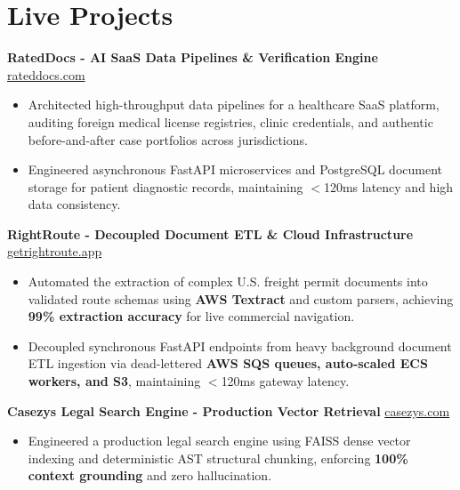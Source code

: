 \documentclass[9.5pt,a4paper]{article}
\begin{document}
\section*{Live Projects}
\noindent
\textbf{RatedDocs - AI SaaS Data Pipelines \& Verification Engine} \hfill \href{https://rateddocs.com}{rateddocs.com}
\begin{itemize}
    \item Architected high-throughput data pipelines for a healthcare SaaS platform, auditing foreign medical license registries, clinic credentials, and authentic before-and-after case portfolios across jurisdictions.
    \item Engineered asynchronous FastAPI microservices and PostgreSQL document storage for patient diagnostic records, maintaining $<$120ms latency and high data consistency.
\end{itemize}
\vspace{0.6pt}
\noindent
\textbf{RightRoute - Decoupled Document ETL & Cloud Infrastructure} \hfill \href{https://getrightroute.app}{getrightroute.app}
\begin{itemize}
    \item Automated the extraction of complex U.S. freight permit documents into validated route schemas using \textbf{AWS Textract} and custom parsers, achieving \textbf{99\% extraction accuracy} for live commercial navigation.
    \item Decoupled synchronous FastAPI endpoints from heavy background document ETL ingestion via dead-lettered \textbf{AWS SQS queues, auto-scaled ECS workers, and S3}, maintaining $<$120ms gateway latency.
\end{itemize}
\vspace{0.6pt}
\noindent
\textbf{Casezys Legal Search Engine - Production Vector Retrieval} \hfill \href{https://casezys.com}{casezys.com}
\begin{itemize}
    \item Engineered a production legal search engine using FAISS dense vector indexing and deterministic AST structural chunking, enforcing \textbf{100\% context grounding} and zero hallucination.
\end{itemize}
\vspace{0.6pt}
\end{document}
